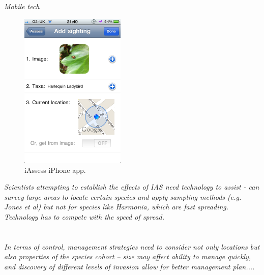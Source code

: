 \documentclass[10pt,psfig,letterpaper,twocolumn]{article}
\begin{document}
\emph{Mobile tech}

\begin{figure}[htbp]
   \centering
   \includegraphics[width = 5cm]{img/iAssess.png} %
   \caption{iAssess iPhone app.}
   \label{fig:iOS}
\end{figure}

\emph{Scientists attempting to establish the effects of IAS need technology to assist - can survey large areas to locate certain species and apply sampling methods (e.g. Jones et al) but not for species like Harmonia, which are fast spreading. Technology has to compete with the speed of spread.}

\section*{}

\emph{In terms of control, management strategies need to consider not only locations but also properties of the species cohort -- size may affect ability to manage quickly, and discovery of different levels of invasion allow for better management plan....
}

\section*{}


\addtolength{\bibsep}{-2mm}
{\footnotesize
}
\end{document}
